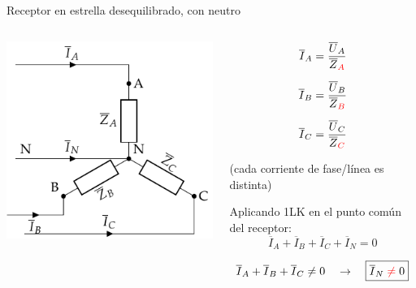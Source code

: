 \documentclass[aspectratio=169, usenames,svgnames,dvipsnames]{beamer}
\begin{document}
\begin{frame}{Receptor en estrella desequilibrado, \hspace{3mm} con neutro}
    \begin{columns}
    \begin{column}{0.5\columnwidth}
        \begin{center}
            \includegraphics[width=.9\linewidth]{../figs/EstrellaDesequilibrado_Receptor.pdf}
        \end{center}
    \end{column}
    
    \begin{column}{0.5\columnwidth}
        \begin{align*}
          \overline{I}_A &= \frac{\overline{U}_A}{\overline{Z}_{\color{red}{A}}}\\[6pt]
          \overline{I}_B &= \frac{\overline{U}_B}{\overline{Z}_{\color{red}{B}}}\\[6pt]
          \overline{I}_C &= \frac{\overline{U}_C}{\overline{Z}_{\color{red}{C}}}
        \end{align*}

        \begin{center}
            \footnotesize{(cada corriente de fase/línea es \alert{distinta})}
        \end{center}
        
        \vspace{2mm}
        \small{Aplicando \alert{1LK} en el punto común del receptor:}
        \vspace{1mm}
        \[
          \overline{I}_A  + \overline{I}_B + \overline{I}_C + \overline{I}_N = 0
        \]

        \vspace{-3mm}
        \[
           \overline{I}_A  + \overline{I}_B + \overline{I}_C  \neq 0 \quad \rightarrow \quad \boxed{\overline{I}_N \; {\color{red} \neq} \; 0}
        \]
    \end{column}
    \end{columns}
\end{frame}
\end{document}

